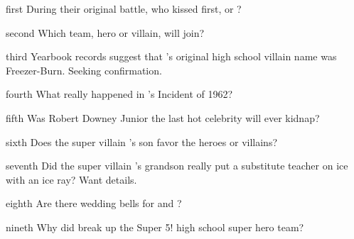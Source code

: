 \documentclass[notebook]{LRSguildcamp1} %
\begin{document}
\startnotebook{\nTween{}}

\begin{page}{first}
During their original battle, who kissed first, \cOS{\MYsupername} or \cOldest{\MYsupername}?
\end{page}

\begin{page}{second}
Which team, hero or villain, will \cGrad{} join?
\end{page}

\begin{page}{third}
Yearbook records suggest that \cOldest{\MYsupername}'s original high school villain name was Freezer-Burn. Seeking confirmation. 
\end{page}

\begin{page}{fourth}
What really happened in \cGrandma{\MYsupername}'s Incident of 1962?
\end{page}

\begin{page}{fifth}
Was Robert Downey Junior the last hot celebrity  \cGrandma{\MYsupername} will ever kidnap?
\end{page}


\begin{page}{sixth}
Does the super villain \cGrandma{\MYsupername}'s son \cArchitect{} favor the heroes or villains?
\end{page}


\begin{page}{seventh}
Did the super villain \cGrandma{\MYsupername}'s grandson \cTeen{} really put a substitute teacher on ice with an ice ray? Want details. 
\end{page}

\begin{page}{eighth}
Are there wedding bells for \cYoungest{\MYsupername} and \cYS{\MYsupername} ?
\end{page}

\begin{page}{nineth}
Why did \cYoungest{\MYsupername} break up the Super 5! high school super hero team?
\end{page}

\endnotebook
\end{document}
